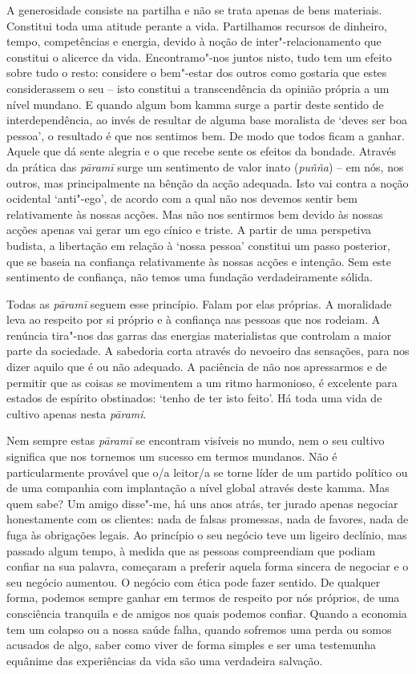 A generosidade consiste na partilha e não se trata apenas de bens materiais. Constitui toda uma atitude perante a vida. Partilhamos recursos de dinheiro, tempo, competências e energia, devido à noção de inter"-relacionamento que constitui o alicerce da vida. Encontramo"-nos juntos nisto, tudo tem um efeito sobre tudo o resto: considere o bem"-estar dos outros como gostaria que estes considerassem o seu -- isto constitui a transcendência da opinião própria a um nível mundano. E quando algum bom kamma surge a partir deste sentido de interdependência, ao invés de resultar de alguma base moralista de `deves ser boa pessoa', o resultado é que nos sentimos bem. De modo que todos ficam a ganhar. Aquele que dá sente alegria e o que recebe sente os efeitos da bondade. Através da prática das \emph{pāramī} surge um sentimento de valor inato (\emph{puñña}) -- em nós, nos outros, mas principalmente na bênção da acção adequada. Isto vai contra a noção ocidental `anti"-ego', de acordo com a qual não nos devemos sentir bem relativamente às nossas acções. Mas não nos sentirmos bem devido às nossas acções apenas vai gerar um ego cínico e triste. A partir de uma perspetiva budista, a libertação em relação à `nossa pessoa' constitui um passo posterior, que se baseia na confiança relativamente às nossas acções e intenção. Sem este sentimento de confiança, não temos uma fundação verdadeiramente sólida.

Todas as \emph{pāramī} seguem esse princípio. Falam por elas próprias. A moralidade leva ao respeito por si próprio e à confiança nas pessoas que nos rodeiam. A renúncia tira"-nos das garras das energias materialistas que controlam a maior parte da sociedade. A sabedoria corta através do nevoeiro das sensações, para nos dizer aquilo que é ou não adequado. A paciência de não nos apressarmos e de permitir que as coisas se movimentem a um ritmo harmonioso, é excelente para estados de espírito obstinados: `tenho de ter isto feito'. Há toda uma vida de cultivo apenas nesta \emph{pārami}.

Nem sempre estas \emph{pāramī} se encontram visíveis no mundo, nem o seu cultivo significa que nos tornemos um sucesso em termos mundanos. Não é particularmente provável que o/a leitor/a se torne líder de um partido político ou de uma companhia com implantação a nível global através deste kamma. Mas quem sabe? Um amigo disse"-me, há uns anos atrás, ter jurado apenas negociar honestamente com os clientes: nada de falsas promessas, nada de favores, nada de fuga às obrigações legais. Ao princípio o seu negócio teve um ligeiro declínio, mas passado algum tempo, à medida que as pessoas compreendiam que podiam confiar na sua palavra, começaram a preferir aquela forma sincera de negociar e o seu negócio aumentou. O negócio com ética pode fazer sentido. De qualquer forma, podemos sempre ganhar em termos de respeito por nós próprios, de uma consciência tranquila e de amigos nos quais podemos confiar. Quando a economia tem um colapso ou a nossa saúde falha, quando sofremos uma perda ou somos acusados de algo, saber como viver de forma simples e ser uma testemunha equânime das experiências da vida são uma verdadeira salvação.

